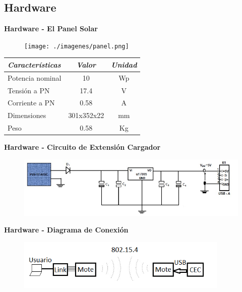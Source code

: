 \documentclass[aspectratio=43, handout]{beamer}
\begin{document}
\subsection[Hardware]{Hardware}
\begin{frame}{\textbf{\LARGE{Hardware - El Panel Solar}}}
\begin{center}
			\begin{figure}[H]
			\texttt{[image: ./imagenes/panel.png]}
		\end{figure}	
		
	\begin{tabular}{@{} l *2c @{}}    %
		\hline
		\emph{\textbf{Características}} & \emph{\textbf{Valor}} & \emph{\textbf{Unidad}}\\
		\hline
		Potencia nominal	& 10 	& Wp	\\	
		Tensión a PN		& 17.4	& V\\
		Corriente a PN	& 0.58		& A\\
		Dimensiones		& 301x352x22 	& mm\\
		Peso				& 0.58		& Kg	\\
		\hline
	\end{tabular}
\end{center}
\end{frame}

\begin{frame}{\textbf{Hardware - Circuito de Extensión Cargador}}
		\begin{figure}[H]
			\includegraphics[width=1\textwidth]{./imagenes/circuito.jpg}
		\end{figure}	
\end{frame}

\begin{frame}{\textbf{\LARGE{Hardware - Diagrama de Conexión}}}
		\begin{figure}[H]
			\includegraphics[width=0.9\textwidth]{./imagenes/conex.png}
		\end{figure}	
\end{frame}
\end{document}
